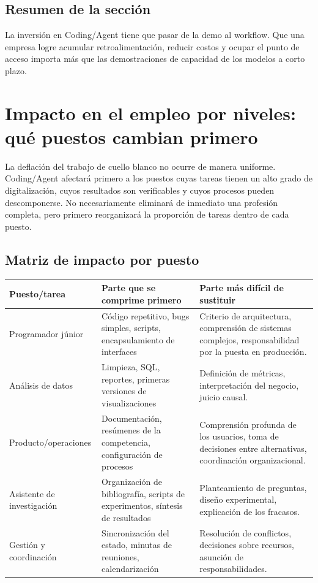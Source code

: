 \documentclass[a4paper]{article}
\begin{document}
\subsection{Resumen de la sección}

La inversión en Coding/Agent tiene que pasar de la demo al workflow. Que una empresa logre acumular retroalimentación, reducir costos y ocupar el punto de acceso importa más que las demostraciones de capacidad de los modelos a corto plazo.
\section{Impacto en el empleo por niveles: qué puestos cambian primero}

La deflación del trabajo de cuello blanco no ocurre de manera uniforme. Coding/Agent afectará primero a los puestos cuyas tareas tienen un alto grado de digitalización, cuyos resultados son verificables y cuyos procesos pueden descomponerse. No necesariamente eliminará de inmediato una profesión completa, pero primero reorganizará la proporción de tareas dentro de cada puesto.

\subsection{Matriz de impacto por puesto}

\noindent\begin{longtable}{p{}p{}p{}}
\toprule
Puesto/tarea & Parte que se comprime primero & Parte más difícil de sustituir \\
\midrule
Programador júnior & Código repetitivo, bugs simples, scripts, encapsulamiento de interfaces & Criterio de arquitectura, comprensión de sistemas complejos, responsabilidad por la puesta en producción. \\
Análisis de datos & Limpieza, SQL, reportes, primeras versiones de visualizaciones & Definición de métricas, interpretación del negocio, juicio causal. \\
Producto/operaciones & Documentación, resúmenes de la competencia, configuración de procesos & Comprensión profunda de los usuarios, toma de decisiones entre alternativas, coordinación organizacional. \\
Asistente de investigación & Organización de bibliografía, scripts de experimentos, síntesis de resultados & Planteamiento de preguntas, diseño experimental, explicación de los fracasos. \\
Gestión y coordinación & Sincronización del estado, minutas de reuniones, calendarización & Resolución de conflictos, decisiones sobre recursos, asunción de responsabilidades. \\
\bottomrule
\end{longtable}
\end{document}
